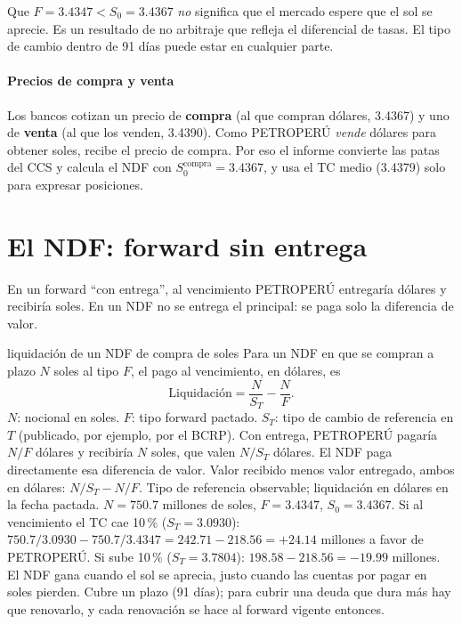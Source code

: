 \begin{importante}
Que $F=3.4347<S_0=3.4367$ \emph{no} significa que el mercado espere que el sol se aprecie. Es un resultado de no arbitraje que refleja el diferencial de tasas. El tipo de cambio dentro de 91 días puede estar en cualquier parte.
\end{importante}

\paragraph{Precios de compra y venta} Los bancos cotizan un precio de \textbf{compra} (al que compran dólares, 3.4367) y uno de \textbf{venta} (al que los venden, 3.4390). Como PETROPERÚ \emph{vende} dólares para obtener soles, recibe el precio de compra. Por eso el informe convierte las patas del CCS y calcula el NDF con $S^{\text{compra}}_0=3.4367$, y usa el TC medio (3.4379) solo para expresar posiciones.

\section{El NDF: forward sin entrega}

En un forward \enquote{con entrega}, al vencimiento PETROPERÚ entregaría dólares y recibiría soles. En un NDF no se entrega el principal: se paga solo la diferencia de valor.

\begin{ficha}{liquidación de un NDF de compra de soles}
 Para un NDF en que se compran a plazo $N$ soles al tipo $F$, el pago al vencimiento, en dólares, es
\[ \text{Liquidación}=\frac{N}{S_T}-\frac{N}{F}. \]
 $N$: nocional en soles. $F$: tipo forward pactado. $S_T$: tipo de cambio de referencia en $T$ (publicado, por ejemplo, por el BCRP).
 Con entrega, PETROPERÚ pagaría $N/F$ dólares y recibiría $N$ soles, que valen $N/S_T$ dólares. El NDF paga directamente esa diferencia de valor.
 Valor recibido menos valor entregado, ambos en dólares: $N/S_T-N/F$.
 Tipo de referencia observable; liquidación en dólares en la fecha pactada.
 $N=750.7$ millones de soles, $F=3.4347$, $S_0=3.4367$. Si al vencimiento el TC cae 10\,\% ($S_T=3.0930$): $750.7/3.0930-750.7/3.4347=242.71-218.56=+24.14$ millones a favor de PETROPERÚ. Si sube 10\,\% ($S_T=3.7804$): $198.58-218.56=-19.99$ millones.
 El NDF gana cuando el sol se aprecia, justo cuando las cuentas por pagar en soles pierden.
 Cubre un plazo (91 días); para cubrir una deuda que dura más hay que renovarlo, y cada renovación se hace al forward vigente entonces.
\end{ficha}


